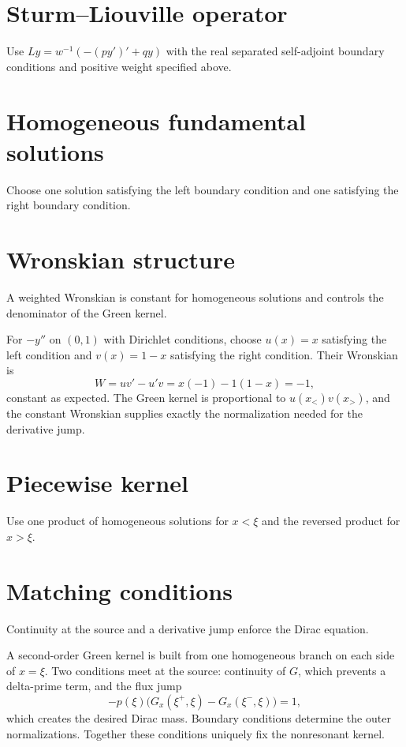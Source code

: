 \section{Sturm--Liouville operator}
Use $Ly=w^{-1}(-(py')'+qy)$ with the real separated self-adjoint boundary conditions and positive weight specified above.

\section{Homogeneous fundamental solutions}
Choose one solution satisfying the left boundary condition and one satisfying the right boundary condition.

\section{Wronskian structure}
A weighted Wronskian is constant for homogeneous solutions and controls the denominator of the Green kernel.


\begin{example}\label{ex:iii26-expand-01}
For \(-y''\) on \((0,1)\) with Dirichlet conditions, choose
\(u(x)=x\) satisfying the left condition and \(v(x)=1-x\) satisfying the right
condition. Their Wronskian is
\[
W=u v'-u'v=x(-1)-1(1-x)=-1,
\]
constant as expected. The Green kernel is proportional to
\(u(x_<)v(x_>)\), and the constant Wronskian supplies exactly the normalization
needed for the derivative jump.
\end{example}
\section{Piecewise kernel}
Use one product of homogeneous solutions for $x<\xi$ and the reversed product for $x>\xi$.

\section{Matching conditions}
Continuity at the source and a derivative jump enforce the Dirac equation.


\begin{example}\label{ex:iii26-expand-02}
A second-order Green kernel is built from one homogeneous branch on each side of
\(x=\xi\). Two conditions meet at the source: continuity of \(G\), which
prevents a delta-prime term, and the flux jump
\[
-p(\xi)\bigl(G_x(\xi^+,\xi)-G_x(\xi^-,\xi)\bigr)=1,
\]
which creates the desired Dirac mass. Boundary conditions determine the outer
normalizations. Together these conditions uniquely fix the nonresonant kernel.
\end{example}

